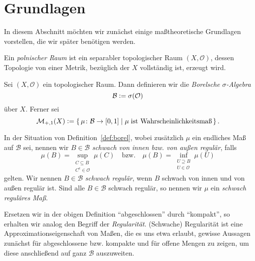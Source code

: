 \documentclass[../main/main.tex]{subfiles}
\begin{document}
	
	\section{Grundlagen}
	\label{Grundlagen}
	
	In diesem Abschnitt möchten wir zunächst einige maßtheoretische Grundlagen vorstellen, 
	die wir später benötigen werden.

	\begin{Definition}
		Ein \emph{polnischer Raum} ist ein separabler topologischer Raum $(X, \mathcal{O})$, 
		dessen Topologie von einer Metrik, bezüglich der $X$ vollständig ist, erzeugt wird.
	\end{Definition}

	\begin{Definition}
		\label{def:borel}
		Sei $(X, \mathcal{O})$ ein topologischer Raum. Dann definieren wir die \emph{Borelsche 
		$\sigma$-Algebra}
		$$\mathcal{B} \vcentcolon = \sigma(\mathcal{O})$$
		über $X$. Ferner sei
		$$\mathcal{M}_{+,1}(X) \vcentcolon = \left\{\, \mu \colon \mathcal{B} \to [0,1] \; | \; \mu \; 
			\text{ist Wahrscheinlichkeitsmaß} \,\right\}\text{.}$$
	\end{Definition}

	\begin{Definition}
		\label{def:regularity}
		In der Situation von Definition~\ref{def:borel}, wobei zusätzlich $\mu$ ein 
		endliches Maß auf $\mathcal{B}$ sei, nennen wir $B \in \mathcal{B}$ \emph{schwach von 
		innen bzw. von außen regulär}, falls
		$$\mu(B) = \sup_{\substack{C \subseteq B \\ C^\mathsf{c} \in \mathcal{O}}} \mu(C) 
		\quad \text{bzw.} \quad \mu(B) = \inf_{\substack{U \supseteq B \\ U \in \mathcal{O}}} 
		\mu(U)$$
		gelten. Wir nennen $B \in \mathcal{B}$ \emph{schwach regulär}, wenn $B$ schwach von innen und 
		von außen regulär ist. Sind alle $B \in \mathcal{B}$ schwach regulär, 
		so nennen wir $\mu$ ein \emph{schwach reguläres Maß}.
	\end{Definition}

	\begin{Bemerkung}
		Ersetzen wir in der obigen Definition \enquote{abgeschlossen} durch \enquote{kompakt}, 
		so erhalten wir analog den Begriff der \emph{Regularität}. (Schwache) Regularität ist eine 
		Approximationseigenschaft von Maßen, die es uns etwa erlaubt, gewisse Aussagen 
		zunächst für abgeschlossene bzw. kompakte und für offene Mengen zu zeigen, um diese 
		anschließend auf ganz $\mathcal{B}$ auszuweiten.
	\end{Bemerkung}
\end{document}
